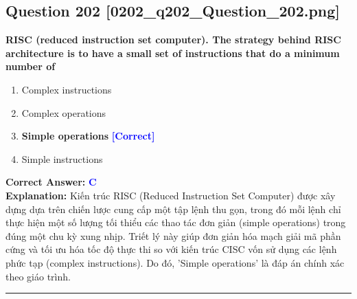 \documentclass[11pt,a4paper]{article}
\begin{document}
\begin{minipage}{\textwidth}
\subsection*{Question 202 \quad \footnotesize{[0202\_q202\_Question\_202.png]}}
\noindent \textbf{RISC (reduced instruction set computer). The strategy behind RISC architecture is to have a small set of instructions that do a minimum number of}

\begin{enumerate}[label=\Alph*.]
    \item Complex instructions
    \item Complex operations
    \item \textbf{Simple operations} \hfill \textcolor{blue}{\textbf{[Correct]}}
    \item Simple instructions
\end{enumerate}

\noindent \textbf{Correct Answer:} \textcolor{blue}{\textbf{C}} \\[2pt]
\noindent \textbf{Explanation:} Kiến trúc RISC (Reduced Instruction Set Computer) được xây dựng dựa trên chiến lược cung cấp một tập lệnh thu gọn, trong đó mỗi lệnh chỉ thực hiện một số lượng tối thiểu các thao tác đơn giản (simple operations) trong đúng một chu kỳ xung nhịp. Triết lý này giúp đơn giản hóa mạch giải mã phần cứng và tối ưu hóa tốc độ thực thi so với kiến trúc CISC vốn sử dụng các lệnh phức tạp (complex instructions). Do đó, 'Simple operations' là đáp án chính xác theo giáo trình.

\par\vspace{0.3cm}
\hrule
\vspace{0.3cm}
\end{minipage}
\end{document}
